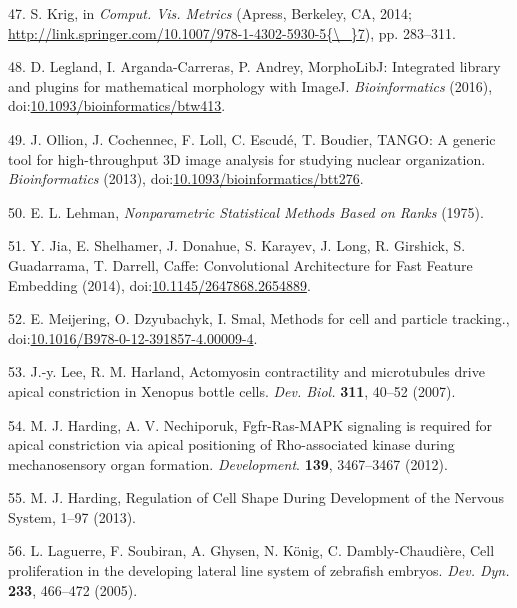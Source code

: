\documentclass[11pt,singlespacinge,twoside]{reedthesis} %
\begin{document}
\leavevmode\hypertarget{ref-Krig2014}{}%
47. S. Krig, in \emph{Comput. Vis. Metrics} (Apress, Berkeley, CA, 2014; \href{http://link.springer.com/10.1007/978-1-4302-5930-5\%7B/_\%7D7}{http://link.springer.com/10.1007/978-1-4302-5930-5\{\textbackslash{}\_\}7}), pp. 283--311.

\leavevmode\hypertarget{ref-Legland2016}{}%
48. D. Legland, I. Arganda-Carreras, P. Andrey, MorphoLibJ: Integrated library and plugins for mathematical morphology with ImageJ. \emph{Bioinformatics} (2016), doi:\href{https://doi.org/10.1093/bioinformatics/btw413}{10.1093/bioinformatics/btw413}.

\leavevmode\hypertarget{ref-Ollion2013}{}%
49. J. Ollion, J. Cochennec, F. Loll, C. Escudé, T. Boudier, TANGO: A generic tool for high-throughput 3D image analysis for studying nuclear organization. \emph{Bioinformatics} (2013), doi:\href{https://doi.org/10.1093/bioinformatics/btt276}{10.1093/bioinformatics/btt276}.

\leavevmode\hypertarget{ref-Lehman}{}%
50. E. L. Lehman, \emph{Nonparametric Statistical Methods Based on Ranks} (1975).

\leavevmode\hypertarget{ref-Jia2014}{}%
51. Y. Jia, E. Shelhamer, J. Donahue, S. Karayev, J. Long, R. Girshick, S. Guadarrama, T. Darrell, Caffe: Convolutional Architecture for Fast Feature Embedding (2014), doi:\href{https://doi.org/10.1145/2647868.2654889}{10.1145/2647868.2654889}.

\leavevmode\hypertarget{ref-Meijering2012}{}%
52. E. Meijering, O. Dzyubachyk, I. Smal, Methods for cell and particle tracking., doi:\href{https://doi.org/10.1016/B978-0-12-391857-4.00009-4}{10.1016/B978-0-12-391857-4.00009-4}.

\leavevmode\hypertarget{ref-Lee2009}{}%
53. J.-y. Lee, R. M. Harland, Actomyosin contractility and microtubules drive apical constriction in Xenopus bottle cells. \emph{Dev. Biol.} \textbf{311}, 40--52 (2007).

\leavevmode\hypertarget{ref-Harding2012}{}%
54. M. J. Harding, A. V. Nechiporuk, Fgfr-Ras-MAPK signaling is required for apical constriction via apical positioning of Rho-associated kinase during mechanosensory organ formation. \emph{Development}. \textbf{139}, 3467--3467 (2012).

\leavevmode\hypertarget{ref-Harding2013}{}%
55. M. J. Harding, Regulation of Cell Shape During Development of the Nervous System, 1--97 (2013).

\leavevmode\hypertarget{ref-Laguerre2005a}{}%
56. L. Laguerre, F. Soubiran, A. Ghysen, N. König, C. Dambly-Chaudière, Cell proliferation in the developing lateral line system of zebrafish embryos. \emph{Dev. Dyn.} \textbf{233}, 466--472 (2005).
\end{document}

